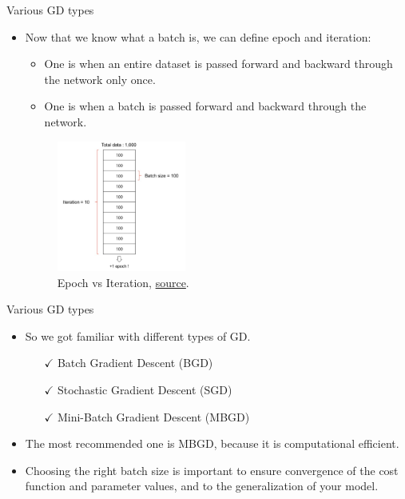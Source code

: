 \begin{frame}{Various GD types}
	\begin{itemize}
		\item Now that we know what a batch is, we can define epoch and iteration:
		\begin{itemize}
			\item One  is when an entire dataset is passed forward and backward through the network only once.
			\item One  is when a batch is passed forward and backward through the network. 
		\end{itemize}
		
		\begin{figure}[H]
			\centering
			\includegraphics[width=0.4\textwidth]{Images/epoch-iteration.png}
			\caption{Epoch vs Iteration, \href{https://jerryan.medium.com/batch-size-a15958708a6}{source}.}
		\end{figure} 
	\end{itemize}
\end{frame}

\begin{frame}{Various GD types}
	\begin{itemize}
		\item So we got familiar with different types of GD.
		\begin{itemize}
			\item[\color{darkgreen}$\checkmark$] Batch Gradient Descent (BGD)
			\item[\color{darkgreen}$\checkmark$] Stochastic Gradient Descent (SGD)
			\item[\color{darkgreen}$\checkmark$] Mini-Batch Gradient Descent (MBGD)
		\end{itemize}
		\item[]
		\item[]
		\item The most recommended one is MBGD, because it is computational efficient.
		\item Choosing the right batch size is important to ensure convergence of the cost function and parameter values, and to the generalization of your model.
	\end{itemize}
\end{frame}